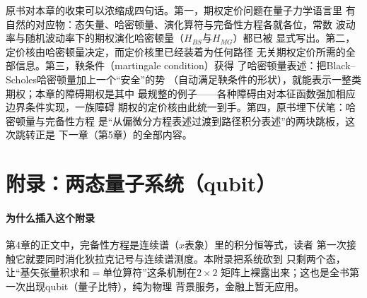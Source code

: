 原书对本章的收束可以浓缩成四句话。第一，期权定价问题在量子力学语言里
有自然的对应物：态矢量、哈密顿量、演化算符与完备性方程各就各位，常数
波动率与随机波动率下的期权演化哈密顿量（$H_{BS}$与$H_{MG}$）都已被
显式写出。第二，定价核由哈密顿量决定，而定价核里已经装着为任何路径
无关期权定价所需的全部信息。第三，鞅条件（martingale condition）获得
了哈密顿量表述：把Black--Scholes哈密顿量加上一个“安全”的势
（自动满足鞅条件的形状），就能表示一整类期权；本章的障碍期权是其中
最规整的例子——各种障碍由对本征函数强加相应边界条件实现，一族障碍
期权的定价核由此统一到手。第四，原书埋下伏笔：哈密顿量与完备性方程
是“从偏微分方程表述过渡到路径积分表述”的两块跳板，这次跳转正是
下一章（第5章）的全部内容。

\section{附录：两态量子系统（qubit）}

\paragraph{为什么插入这个附录}
第4章的正文中，完备性方程是连续谱（$x$表象）里的积分恒等式，读者
第一次接触它就要同时消化狄拉克记号与连续谱测度。本附录把系统砍到
只剩两个态，让“基矢张量积求和$=$单位算符”这条机制在$2\times2$
矩阵上裸露出来；这也是全书第一次出现qubit（量子比特），纯为物理
背景服务，金融上暂无应用。

